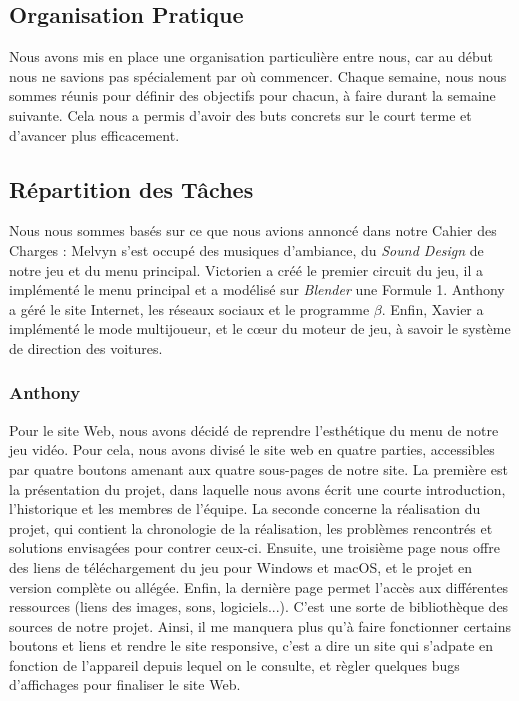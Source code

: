 \documentclass[12pt,a4paper]{article}
\begin{document}
    \subsection{Organisation Pratique}
        Nous avons mis en place une organisation particulière entre nous,
        car au début nous ne savions pas spécialement par où commencer.
        Chaque semaine, nous nous sommes réunis pour définir des 
        objectifs pour chacun, à faire durant la semaine suivante. Cela nous 
        a permis d’avoir des buts concrets sur le court terme et d'avancer plus 
        efficacement.

    \subsection{Répartition des Tâches}
        Nous nous sommes basés sur ce que nous avions annoncé dans notre Cahier des Charges :
        Melvyn s'est occupé des musiques d'ambiance, du \textit{Sound Design} de 
        notre jeu et du menu principal. Victorien a créé le premier circuit du jeu,
        il a implémenté le menu principal et a modélisé sur \textsl{Blender} une Formule 1.
        Anthony a géré le site Internet, les réseaux sociaux et le programme \(\beta\).
        Enfin, Xavier a implémenté le mode multijoueur, et le cœur du moteur de jeu,
        à savoir le système de direction des voitures.

    \subsubsection{Anthony}
        Pour le site Web, nous avons décidé de reprendre l'esthétique du
        menu de notre jeu vidéo. Pour cela, nous avons divisé le site web 
        en quatre parties, accessibles par quatre boutons amenant aux quatre 
        sous-pages de notre site. La première est la présentation du projet, dans laquelle
        nous avons écrit une courte introduction, l'historique et les membres
        de l'équipe. La seconde concerne la réalisation du projet, qui contient
        la chronologie de la réalisation, les problèmes rencontrés et solutions
        envisagées pour contrer ceux-ci. Ensuite, une troisième page nous 
        offre des liens de téléchargement du jeu pour Windows et macOS, et
        le projet en version complète ou allégée.
        Enfin, la dernière page permet l'accès aux différentes ressources
        (liens des images, sons, logiciels...). C'est une sorte de bibliothèque 
        des sources de notre projet.
        Ainsi, il me manquera plus qu'à faire fonctionner certains boutons et 
        liens et rendre le site responsive, c'est a dire un site qui s'adpate en 
        fonction de l'appareil depuis lequel on le consulte, et 
        règler quelques bugs d'affichages pour finaliser le site Web. 
    
\end{document}
